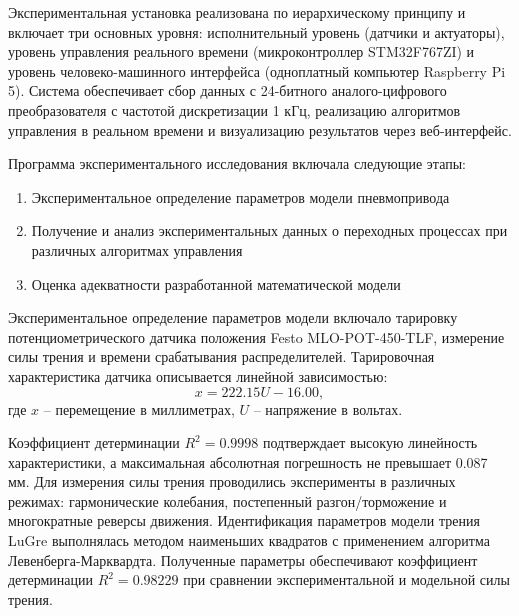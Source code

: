 Экспериментальная установка реализована по иерархическому принципу и включает три основных уровня:
исполнительный уровень (датчики и актуаторы), уровень управления реального
времени (микроконтроллер STM32F767ZI) и уровень человеко-машинного
интерфейса (одноплатный компьютер Raspberry Pi 5). Система обеспечивает сбор данных с 24-битного
аналого-цифрового преобразователя с частотой дискретизации 1 кГц, реализацию
алгоритмов управления в реальном времени и визуализацию результатов через веб-интерфейс.

Программа экспериментального исследования включала следующие этапы:
\begin{enumerate}
	\item Экспериментальное определение параметров модели пневмопривода
	\item Получение и анализ экспериментальных данных о переходных процессах при различных алгоритмах управления
	\item Оценка адекватности разработанной математической модели
\end{enumerate}

Экспериментальное определение параметров модели включало тарировку потенциометрического
датчика положения Festo MLO-POT-450-TLF, измерение силы трения и времени срабатывания
распределителей. Тарировочная характеристика датчика описывается линейной зависимостью:
\begin{equation}
	x = \num{222.15}U - \num{16.00},
\end{equation}
где $x$ -- перемещение в миллиметрах, $U$ -- напряжение в вольтах.

Коэффициент детерминации $R^2 = \num{0.9998}$ подтверждает высокую линейность характеристики, а максимальная абсолютная погрешность не превышает \num{0.087} мм.
Для измерения силы трения проводились эксперименты в различных режимах: гармонические колебания,
постепенный разгон/торможение и многократные реверсы движения. Идентификация параметров модели трения
LuGre выполнялась методом наименьших квадратов с применением алгоритма Левенберга-Марквардта.
Полученные параметры
обеспечивают коэффициент детерминации $R^2 = \num{0.98229}$ при сравнении экспериментальной и модельной силы трения.

